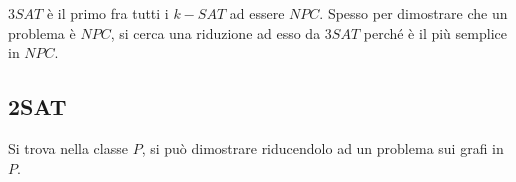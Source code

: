 \begin{remark}
	$3SAT$ è il primo fra tutti i $k-SAT$ ad essere $NPC$. Spesso per dimostrare che un problema è $NPC$, si cerca una riduzione ad esso da $3SAT$ perché è il più semplice in $NPC$.
\end{remark}

\subsection{2SAT}

Si trova nella classe $P$, si può dimostrare riducendolo ad un problema sui grafi in $P$.
